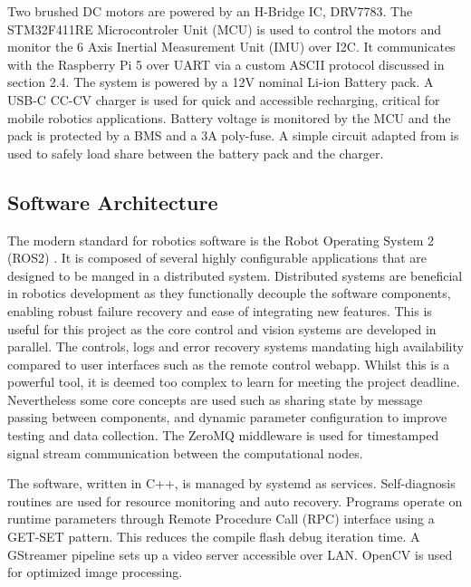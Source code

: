         Two brushed DC motors are powered by an H-Bridge IC, DRV7783. 
        The STM32F411RE Microcontroler Unit (MCU) is used to control the 
        motors and monitor the 6 Axis Inertial Measurement Unit (IMU) over I2C. It communicates with the 
        Raspberry Pi 5 over UART via a custom ASCII protocol discussed in section 2.4. 
        The system is powered by a 12V nominal Li-ion Battery pack. A USB-C CC-CV charger is used for quick 
        and accessible recharging, critical for mobile robotics applications. 
        Battery voltage is monitored by the MCU and the pack is protected by a BMS and a 3A poly-fuse.
        A simple circuit adapted from \cite{chu2008designing} is used to safely load share between the battery pack and the charger.

        \subsection{Software Architecture}
        The modern standard for robotics software is the Robot Operating System 2 (ROS2) \cite{Macenski2022RobotOS}. 
        It is composed of several highly configurable applications that are designed to be manged in a distributed system.
        Distributed systems are beneficial in robotics development as they functionally decouple the software components, 
        enabling robust failure recovery and ease of integrating new features. This is useful for this project as 
        the core control and vision systems are developed in parallel. The controls, logs and error recovery systems mandating 
        high availability compared to user interfaces such as the remote control webapp. 
        Whilst this is a powerful tool, it is deemed too complex to learn for meeting the project deadline.
        Nevertheless some core concepts are used such as sharing state by message passing between components, 
        and dynamic parameter configuration to improve testing and data collection. The ZeroMQ middleware is used for 
        timestamped signal stream communication between the computational nodes. 

        The software, written in C++, is managed by systemd as services. 
        Self-diagnosis routines are used for resource monitoring and auto recovery. 
        Programs operate on runtime parameters through Remote Procedure Call (RPC) 
        interface using a GET-SET pattern. This reduces the 
        compile flash debug iteration time. A GStreamer pipeline sets up a video 
        server accessible over LAN. OpenCV is used for optimized image processing.
      
